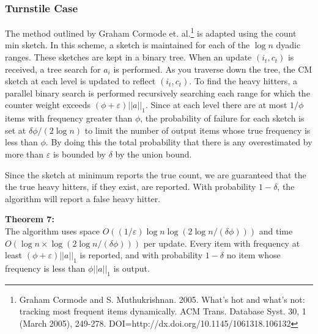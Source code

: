 \documentclass[11pt]{article}
\begin{document}
\subsubsection{Turnstile Case}
The method outlined by Graham Cormode et. al.\footnote{Graham Cormode and S. Muthukrishnan. 2005. What's hot and what's not: tracking most frequent items dynamically. ACM Trans. Database Syst. 30, 1 (March 2005), 249-278. DOI=http://dx.doi.org/10.1145/1061318.106132} is adapted using the count min sketch. In this scheme, a sketch is maintained for each of the $\log n$ dyadic ranges. These sketches are kept in a binary tree. When an update $(i_t, c_t)$ is received, a tree search for $a_i$ is performed. As you traverse down the tree, the CM sketch at each level is updated to reflect $(i_t, c_t)$. To find the heavy hitters, a parallel binary search is performed recursively searching each range for which the counter weight exceeds $(\phi + \varepsilon)||a||_1$. Since at each level there are at most $1/\phi$ items with frequency greater than $\phi$, the probability of failure for each sketch is set at $\delta\phi/(2\log n)$ to limit the number of output items whose true frequency is less than $\phi$. By doing this the total probability that there is any overestimated by more than $\varepsilon$ is bounded by $\delta$ by the union bound.

Since the sketch at minimum reports the true count, we are guaranteed that the the true heavy hitters, if they exist, are reported. With probability $1 - \delta$, the algorithm will report a false heavy hitter.

\textbf{Theorem 7:} \\
The algorithm uses space $O((1/\varepsilon)\log n \log (2 \log n/(\delta \phi)))$ and time $O(\log n \times \log(2 \log n/(\delta\phi)))$ per update. Every item with frequency at least $(\phi + \varepsilon)||a||_1$ is reported, and with probability $1-\delta$ no item whose frequency is less than $\phi ||a||_1$ is output.


\end{document}
